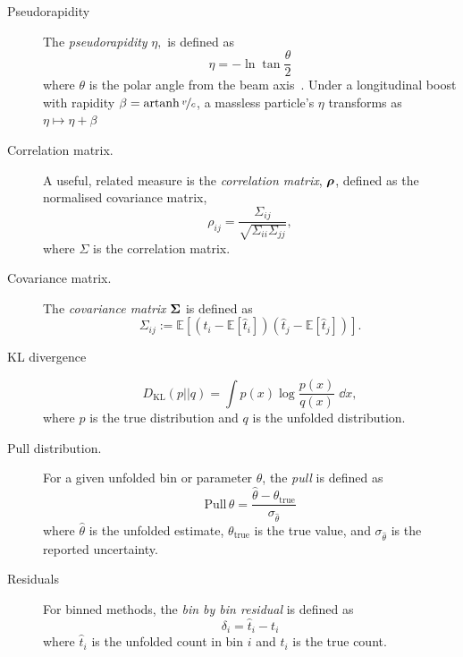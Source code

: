 \begin{description}
\item [Pseudorapidity]
        The \emph{pseudorapidity} \(\eta,\) is defined as
        \[
            \eta = -\ln \tan\frac\theta2
            \]
        where \(\theta\) is the polar angle from the beam axis~\cite{rubbia_phenomenology_2022}.
        Under a longitudinal boost with rapidity \(\beta = \operatorname{artanh}\nicefrac{v}{c}\), a massless particle's \(\eta\) transforms as \(\eta\mapsto\eta+\beta\)

\item [Correlation matrix.]
                A useful, related measure is the \emph{correlation matrix}, \(\vb*{\rho}\), defined as the normalised covariance matrix,
                \begin{equation}
                    \rho_{ij} = \frac{\Sigma_{ij}}{\sqrt{\Sigma_{ii}\Sigma_{jj}}},
                \end{equation}
                where \(\Sigma\) is the correlation matrix.

\item [Covariance matrix.]
                The \emph{covariance matrix} \(\vb*{\Sigma}\) is defined as
                \begin{equation}
                    \Sigma_{ij} := \mathbb{E}[(\hat{t}_i - \mathbb{E}[\hat{t}_i])(\hat{t}_j - \mathbb{E}[\hat{t}_j])].
                \end{equation}

\item [KL divergence]
                \begin{equation}
                    D_{\text{KL}}(p||q) = \int p(x) \log \frac{p(x)}{q(x)} \;\dd x,
                \end{equation}
                where \(p\) is the true distribution and
                \(q\) is the unfolded distribution.

\item [Pull distribution.]
                For a given unfolded bin or parameter \(\theta\), the \emph{pull} is defined as
            \begin{equation}
                \text{Pull}\,{\theta} = \frac{\hat{\theta} - \theta_{\text{true}}}{\sigma_{\hat{\theta}}}
            \end{equation}
            where \(\hat{\theta}\) is the unfolded estimate, \(\theta_{\text{true}}\) is the true value, and \(\sigma_{\hat{\theta}}\) is the reported uncertainty.

\item [Residuals]
                For binned methods, the \emph{bin by bin residual} is defined as
            \begin{equation}
                \delta_i = \hat{t}_i - t_i
            \end{equation}
            where \(\hat{t}_i\) is the unfolded count in bin \(i\) and \(t_i\) is the true count.


\end{description}
